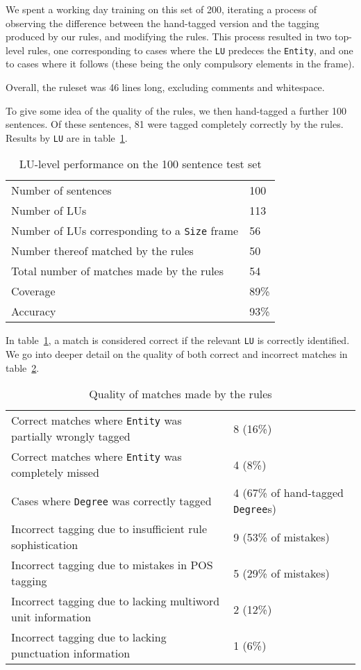 \documentclass{llncs}
\begin{document}
We spent a working day training on this set of 200, iterating a process
of observing the difference between the hand-tagged version and the
tagging produced by our rules, and modifying the rules. This process resulted
in two top-level rules, one corresponding to cases where the \verb+LU+ predeces
the \verb+Entity+, and one to cases where it follows (these being the only
compulsory elements in the frame).

Overall, the ruleset was 46 lines long, excluding comments and whitespace.

To give some idea of the quality of the rules, we then hand-tagged a further 100 sentences.
Of these sentences, 81 were tagged completely correctly by the rules. Results by \verb+LU+ are in
table~\ref{luperf}.

\begin{table}[h]
  \centering
  \begin{tabular}{l | l}
    \hline
    Number of sentences & 100 \\
    Number of LUs & 113 \\
    Number of LUs corresponding to a \verb+Size+ frame & 56 \\ %
    Number thereof matched by the rules & 50 \\
    Total number of matches made by the rules & 54 \\
    \hline
    Coverage & 89\% \\
    Accuracy & 93\% \\
    \hline
  \end{tabular}
  \caption{LU-level performance on the 100 sentence test set}
  \label{luperf}
\end{table}

In table~\ref{luperf}, a match is considered correct if the relevant \verb+LU+
is correctly identified. We go into deeper detail on the quality of both
correct and incorrect matches in table~\ref{framequality}.

\begin{table}[h]
  \centering
  \begin{tabular}{ l | l }
    \hline
    Correct matches where \verb+Entity+ was partially wrongly tagged & 8 (16\%) \\
    Correct matches where \verb+Entity+ was completely missed & 4 (8\%) \\
    Cases where \verb+Degree+ was correctly tagged & 4 (67\% of hand-tagged \verb+Degree+s) \\
    Incorrect tagging due to insufficient rule sophistication & 9 (53\% of mistakes) \\
    Incorrect tagging due to mistakes in POS tagging & 5 (29\% of mistakes) \\
    Incorrect tagging due to lacking multiword unit information & 2 (12\%) \\
    Incorrect tagging due to lacking punctuation information & 1 (6\%) \\
    \hline
  \end{tabular}
  \caption{Quality of matches made by the rules}
  \label{framequality}
\end{table}
\end{document}
